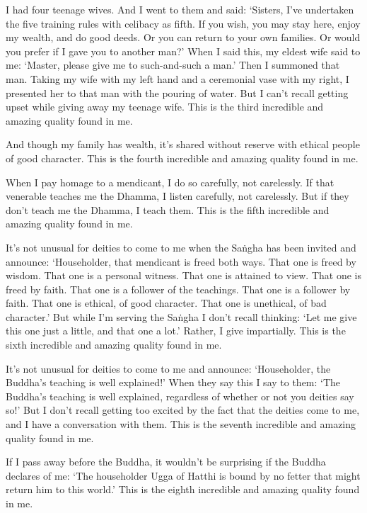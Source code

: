 \documentclass[12pt,openany]{book}%
\begin{document}
I had four teenage wives. And I went to them and said: ‘Sisters, I’ve undertaken the five training rules with celibacy as fifth. If you wish, you may stay here, enjoy my wealth, and do good deeds. Or you can return to your own families. Or would you prefer if I gave you to another man?’ When I said this, my eldest wife said to me: ‘Master, please give me to such-and-such a man.’ Then I summoned that man. Taking my wife with my left hand and a ceremonial vase with my right, I presented her to that man with the pouring of water. But I can’t recall getting upset while giving away my teenage wife. This is the third incredible and amazing quality found in me. 

And though my family has wealth, it’s shared without reserve with ethical people of good character. This is the fourth incredible and amazing quality found in me. 

When I pay homage to a mendicant, I do so carefully, not carelessly. If that venerable teaches me the Dhamma, I listen carefully, not carelessly. But if they don’t teach me the Dhamma, I teach them. This is the fifth incredible and amazing quality found in me. 

It’s not unusual for deities to come to me when the \textsanskrit{Saṅgha} has been invited and announce: ‘Householder, that mendicant is freed both ways. That one is freed by wisdom. That one is a personal witness. That one is attained to view. That one is freed by faith. That one is a follower of the teachings. That one is a follower by faith. That one is ethical, of good character. That one is unethical, of bad character.’ But while I’m serving the \textsanskrit{Saṅgha} I don’t recall thinking: ‘Let me give this one just a little, and that one a lot.’ Rather, I give impartially. This is the sixth incredible and amazing quality found in me. 

It’s not unusual for deities to come to me and announce: ‘Householder, the Buddha’s teaching is well explained!’ When they say this I say to them: ‘The Buddha’s teaching is well explained, regardless of whether or not you deities say so!’ But I don’t recall getting too excited by the fact that the deities come to me, and I have a conversation with them. This is the seventh incredible and amazing quality found in me. 

If I pass away before the Buddha, it wouldn’t be surprising if the Buddha declares of me: ‘The householder Ugga of Hatthi is bound by no fetter that might return him to this world.’ This is the eighth incredible and amazing quality found in me. 
\end{document}
